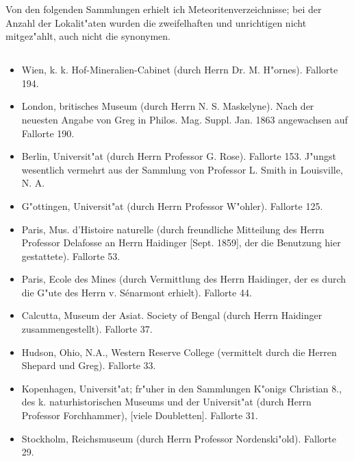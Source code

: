 \documentclass[a4paper, 11pt, oneside]{article}
\begin{document}
Von den folgenden Sammlungen erhielt ich Meteoritenverzeichnisse; bei der Anzahl der Lokalit"aten wurden die zweifelhaften und unrichtigen nicht mitgez"ahlt, auch nicht die synonymen.
\clearpage
\subsection*{}
\begin{itemize}
    \item Wien, k. k. Hof-Mineralien-Cabinet (durch Herrn Dr. M. H"ornes). Fallorte 194.

    \item London, britisches Museum (durch Herrn N. S. Maskelyne). Nach der neuesten Angabe von Greg in Philos. Mag. Suppl. Jan. 1863 angewachsen auf Fallorte 190.

    \item Berlin, Universit"at (durch Herrn Professor G. Rose). Fallorte 153. J"ungst wesentlich vermehrt aus der Sammlung von Professor L. Smith in Louisville, N. A.

    \item G"ottingen, Universit"at (durch Herrn Professor W"ohler). Fallorte 125.

    \item Paris, Mus. d'Histoire naturelle (durch freundliche Mitteilung des Herrn Professor Delafosse an Herrn Haidinger [Sept. 1859], der die Benutzung hier gestattete). Fallorte 53.

    \item Paris, Ecole des Mines (durch Vermittlung des Herrn Haidinger, der es durch die G"ute des Herrn v. Sénarmont erhielt). Fallorte 44.

    \item Calcutta, Museum der Asiat. Society of Bengal (durch Herrn Haidinger zusammengestellt). Fallorte 37.

    \item Hudson, Ohio, N.A., Western Reserve College (vermittelt durch die Herren Shepard und Greg). Fallorte 33.

    \item Kopenhagen, Universit"at; fr"uher in den Sammlungen K"onigs Christian 8., des k. naturhistorischen Museums und der Universit"at (durch Herrn Professor Forchhammer), [viele Doubletten]. Fallorte 31.

    \item Stockholm, Reichsmuseum (durch Herrn Professor Nordenski"old). Fallorte 29.


\end{itemize}
\end{document}
